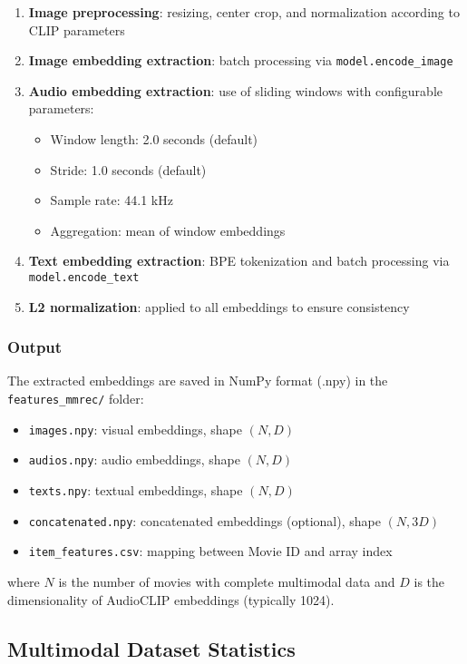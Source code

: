 \begin{enumerate}
    \item \textbf{Image preprocessing}: resizing, center crop, and normalization according to CLIP parameters
    \item \textbf{Image embedding extraction}: batch processing via \texttt{model.encode\_image}
    \item \textbf{Audio embedding extraction}: use of sliding windows with configurable parameters:
    \begin{itemize}
        \item Window length: 2.0 seconds (default)
        \item Stride: 1.0 seconds (default)
        \item Sample rate: 44.1 kHz
        \item Aggregation: mean of window embeddings
    \end{itemize}
    \item \textbf{Text embedding extraction}: BPE tokenization and batch processing via \texttt{model.encode\_text}
    \item \textbf{L2 normalization}: applied to all embeddings to ensure consistency
\end{enumerate}

\subsubsection{Output}

The extracted embeddings are saved in NumPy format (.npy) in the \texttt{features\_mmrec/} folder:

\begin{itemize}
    \item \texttt{images.npy}: visual embeddings, shape $(N, D)$
    \item \texttt{audios.npy}: audio embeddings, shape $(N, D)$
    \item \texttt{texts.npy}: textual embeddings, shape $(N, D)$
    \item \texttt{concatenated.npy}: concatenated embeddings (optional), shape $(N, 3D)$
    \item \texttt{item\_features.csv}: mapping between Movie ID and array index
\end{itemize}

where $N$ is the number of movies with complete multimodal data and $D$ is the dimensionality of AudioCLIP embeddings (typically 1024).

\subsection{Multimodal Dataset Statistics}

